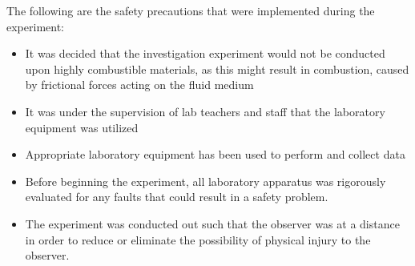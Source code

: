 

{The following are the safety precautions that were implemented during the experiment:}

	\begin{itemize}
		\item {It was decided that the investigation experiment would not be conducted upon highly combustible materials, as this might result in combustion, caused by frictional forces acting on the fluid medium}
		\item {It was under the supervision of lab teachers and staff that the laboratory equipment was utilized}
		\item {Appropriate laboratory equipment has been used to perform and collect data}
		\item {Before beginning the experiment, all laboratory apparatus was rigorously evaluated for any faults that could result in a safety problem.}
		\item {The experiment was conducted out such that the observer was at a distance in order to reduce or eliminate the possibility of physical injury to the observer.}
	\end{itemize}

